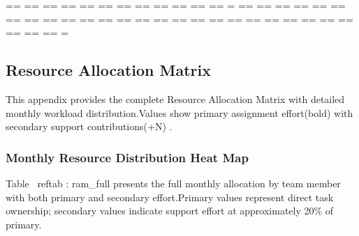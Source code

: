     == == == == == == == == == == == ==
    = %
      == == == == == == == == == == == == == == == == == == == == == == == == ==
      == == ==
    =

\subsection {
  Resource Allocation Matrix
}
\label{app : ram}

This appendix provides the complete Resource Allocation Matrix with detailed
    monthly workload distribution.Values show primary assignment
    effort(bold)
with secondary support contributions(+N)
    .

\subsubsection{Monthly Resource Distribution Heat Map}

Table \
ref{tab :
        ram_full} presents the full monthly allocation by team member with both
    primary and secondary effort.Primary values represent direct task ownership;
secondary values indicate support effort at approximately 20\% of primary.

